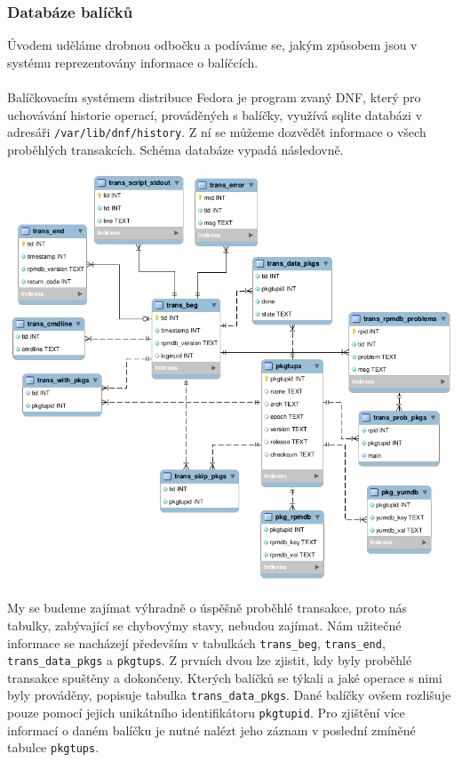 \documentclass[
  field=inf,
  biblatex,
  glossaries,
  index
]{kidiplom}
\begin{document}
		\subsubsection{Databáze balíčků}
		Úvodem uděláme drobnou odbočku a podíváme se, jakým způsobem jsou v systému reprezentovány informace o balíčcích.
		\\
		\\
		Balíčkovacím systémem distribuce Fedora je program zvaný DNF\@, který pro uchovávání historie operací, prováděných s balíčky, využívá sqlite databázi v adresáři \texttt{/var/lib/dnf/history}. Z ní se můžeme dozvědět informace o všech proběhlých transakcích. Schéma databáze vypadá následovně.

		\centerline{\includegraphics[scale=0.45]{images/dnf-database.png}}

		My se budeme zajímat výhradně o úspěšně proběhlé transakce, proto nás tabulky, zabývající se chybovýmy stavy, nebudou zajímat. Nám užitečné informace se nacházejí především v tabulkách \texttt{trans\_beg}, \texttt{trans\_end}, \texttt{trans\_data\_pkgs} a \texttt{pkgtups}. Z prvních dvou lze zjistit, kdy byly proběhlé transakce spuštěny a dokončeny. Kterých balíčků se týkali a jaké operace s nimi byly prováděny, popisuje tabulka \texttt{trans\_data\_pkgs}. Dané balíčky ovšem rozlišuje pouze pomocí jejich unikátního identifikátoru \texttt{pkgtupid}. Pro zjištění více informací o daném balíčku je nutné nalézt jeho záznam v poslední zmíněné tabulce \texttt{pkgtups}.
\end{document}
